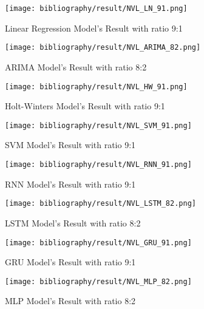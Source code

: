 \documentclass{ieeeojies}
\begin{document}
	\begin{figure}[H]
		\centering
		\begin{minipage}{0.9\linewidth}
			\centering
			\texttt{[image: bibliography/result/NVL\_LN\_91.png]}
			\caption{Linear Regression Model's Result with ratio 9:1}
			\label{fig2.1}
		\end{minipage}
	\end{figure}
	\begin{figure}[H]
		\centering
		\begin{minipage}{0.9\linewidth}
			\centering
			\texttt{[image: bibliography/result/NVL\_ARIMA\_82.png]}
			\caption{ARIMA Model's Result with ratio 8:2}
			\label{fig2.2}
		\end{minipage}
	\end{figure}
	\begin{figure}[H]
		\centering
		\begin{minipage}{0.9\linewidth}
			\centering
			\texttt{[image: bibliography/result/NVL\_HW\_91.png]}
			\caption{Holt-Winters Model's Result with ratio 9:1}
			\label{fig2.3}
		\end{minipage}
	\end{figure}
	\begin{figure}[H]
		\centering
		\begin{minipage}{0.9\linewidth}
			\centering
			\texttt{[image: bibliography/result/NVL\_SVM\_91.png]}
			\caption{SVM Model's Result with ratio 9:1}
			\label{fig2.4}
		\end{minipage}
	\end{figure}
	\begin{figure}[H]
		\centering
		\begin{minipage}{0.9\linewidth}
			\centering
			\texttt{[image: bibliography/result/NVL\_RNN\_91.png]}
			\caption{RNN Model's Result with ratio 9:1}
			\label{fig2.5}
		\end{minipage}
	\end{figure}
	\begin{figure}[H]
		\centering
		\begin{minipage}{0.9\linewidth}
			\centering
			\texttt{[image: bibliography/result/NVL\_LSTM\_82.png]}
			\caption{LSTM Model's Result with ratio 8:2}
			\label{fig2.6}
		\end{minipage}
	\end{figure}
	\begin{figure}[H]
		\centering
		\begin{minipage}{0.9\linewidth}
			\centering
			\texttt{[image: bibliography/result/NVL\_GRU\_91.png]}
			\caption{GRU Model's Result with ratio 9:1}
			\label{fig2.7}
		\end{minipage}
	\end{figure}
	\begin{figure}[H]
		\centering
		\begin{minipage}{0.9\linewidth}
			\centering
			\texttt{[image: bibliography/result/NVL\_MLP\_82.png]}
			\caption{MLP Model's Result with ratio 8:2}
			\label{fig2.8}
		\end{minipage}
	\end{figure}
	
\end{document}
